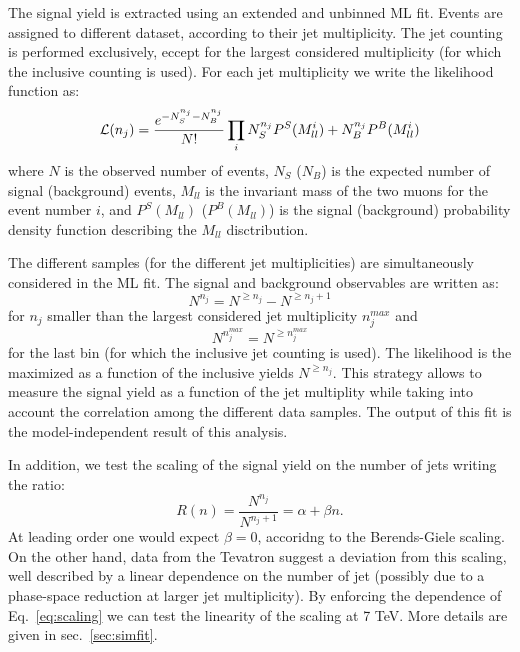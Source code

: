 \documentclass{cmspaper}
\begin{document}
The signal yield is extracted using an extended and unbinned ML
fit. Events are assigned to different dataset, according to their jet
multiplicity. The jet counting is performed exclusively, eccept for
the largest considered multiplicity (for which the inclusive counting
is used). For each jet multiplicity we write the likelihood function 
as:
\begin{equation}
{\cal L}(n_j) = \frac{e^{-N^{n_j}_S-N^{n_j}_B}}{N!}\prod_i{N^{n_j}_S P^S(M^i_{ll}) + N^{n_j}_B P^B(M^i_{ll})}
\end{equation}
where $N$ is the observed number of events, $N_S$ ($N_B$) is the expected
number of signal (background) events, $M_{ll}$ is the invariant mass
of the two muons for the event number $i$, and $P^S(M_{ll})$ ($P^B(M_{ll})$)
is the signal (background) probability density function describing the
$M_{ll}$ disctribution. 

The different samples (for the different jet multiplicities) are
simultaneously considered in the ML fit. The signal and background
observables are written as:
\begin{equation}
N^{n_j} = N^{\geq n_j}- N^{\geq n_j+1}
\end{equation}
for $n_j$ smaller than the largest considered jet multiplicity $n^{max}_j$
and
\begin{equation}
N^{n^{max}_j} = N^{\geq n^{max}_j}
\end{equation}
for the last bin (for which the inclusive jet counting is used).  The
likelihood is the maximized as a function of the inclusive yields
$N^{\geq n_j}$. This strategy allows to measure the signal yield as a
function of the jet multiplity while taking into account the
correlation among the different data samples. The output of this fit is the
model-independent result of this analysis.

In addition, we test the scaling of the signal yield on the number of jets
writing the ratio:
\begin{equation}
R(n) = \frac{N^{n_j}}{N^{n_j+1}} = \alpha + \beta n .
\label{eq:scaling}
\end{equation}
At leading order one would expect $\beta=0$, accoridng to the
Berends-Giele scaling.  On the other hand, data from the Tevatron
suggest a deviation from this scaling, well described by a linear
dependence on the number of jet (possibly due to a phase-space
reduction at larger jet multiplicity). By enforcing the dependence of
Eq.~\ref{eq:scaling} we can test the linearity of the scaling at 7
TeV. More details are given in sec.~\ref{sec:simfit}.
\end{document}

